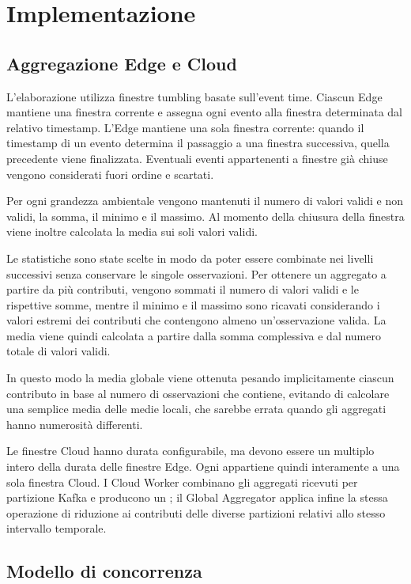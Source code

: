 \section{Implementazione}
\label{sec:implementazione}

\subsection{Aggregazione Edge e Cloud}

L'elaborazione utilizza finestre tumbling basate sull'event time. Ciascun
Edge mantiene una finestra corrente e assegna ogni evento alla finestra
determinata dal relativo timestamp. L'Edge mantiene una sola finestra
corrente: quando il timestamp di un evento determina il passaggio a una
finestra successiva, quella precedente viene finalizzata. Eventuali eventi
appartenenti a finestre già chiuse vengono considerati fuori ordine e
scartati.

Per ogni grandezza ambientale vengono mantenuti il numero di valori validi
e non validi, la somma, il minimo e il massimo. Al momento della chiusura
della finestra viene inoltre calcolata la media sui soli valori validi.

Le statistiche sono state scelte in modo da poter essere combinate nei
livelli successivi senza conservare le singole osservazioni. Per ottenere
un aggregato a partire da più contributi, vengono sommati il numero di valori
validi e le rispettive somme, mentre il minimo e il massimo sono ricavati
considerando i valori estremi dei contributi che contengono almeno
un'osservazione valida. La media viene quindi calcolata a partire dalla somma
complessiva e dal numero totale di valori validi.

In questo modo la media globale viene ottenuta pesando implicitamente ciascun
contributo in base al numero di osservazioni che contiene, evitando di
calcolare una semplice media delle medie locali, che sarebbe errata quando
gli aggregati hanno numerosità differenti.


Le finestre Cloud hanno durata configurabile, ma devono essere un multiplo
intero della durata delle finestre Edge. Ogni  appartiene
quindi interamente a una sola finestra Cloud. I Cloud Worker combinano gli
aggregati ricevuti per partizione Kafka e producono un
; il Global Aggregator applica infine la stessa
operazione di riduzione ai contributi delle diverse partizioni relativi allo
stesso intervallo temporale.

\subsection{Modello di concorrenza}

